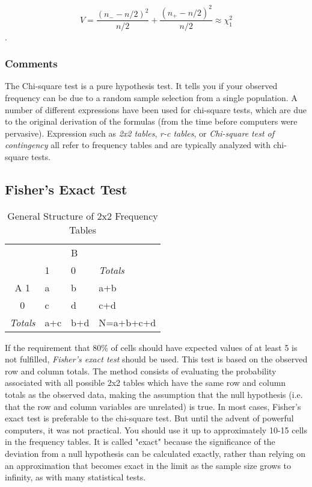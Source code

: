 \begin{equation}
  V = \frac{(n_- - n/2)^2}{n/2} + \frac{(n_+ - n/2)^2}{n/2} \approx \chi^2_1
\end{equation}.


\subsubsection{Comments}
The Chi-square test is a pure hypothesis test. It tells you if your observed frequency can be due to a random sample selection from a single population. A number of different expressions have been used for chi-square tests, which are due to the original derivation of the formulas (from the time before computers were pervasive). Expression such as \emph{2x2 tables}, \emph{r-c tables}, or \emph{Chi-square test of contingency} all refer to frequency tables and are typically analyzed with chi-square tests.


\subsection{Fisher's Exact Test} 

\begin{table}
  \centering
  \begin{tabular}{|c|l l| l|}
  \hline
  &  & B &  \\
  & 1 & 0 & \emph{Totals} \\
  \hline
  A 1 & a & b & a+b \\
    0 & c & d & c+d \\
  \hline
  \emph{Totals} & a+c & b+d & N=a+b+c+d \\
  \hline
  \end{tabular}

  \caption{General Structure of 2x2 Frequency Tables}\label{table:frequencyGeneral}
\end{table}


If the requirement that 80\% of cells should have expected values of at least 5 is not fulfilled, \emph{Fisher's exact test} should be used. This test is based on the observed row and column totals. The method consists of evaluating the probability associated with all possible 2x2 tables which have the same row and column totals as the observed data, making the assumption that the null hypothesis (i.e. that the row and column variables are unrelated) is true.  In most cases, Fisher's exact test is preferable to the chi-square test. But until the advent of powerful computers, it was not practical. You should use it up to approximately 10-15 cells in the frequency tables. It is called "exact" because the significance of the deviation from a null hypothesis can be calculated exactly, rather than relying on an approximation that becomes exact in the limit as the sample size grows to infinity, as with many statistical tests.

